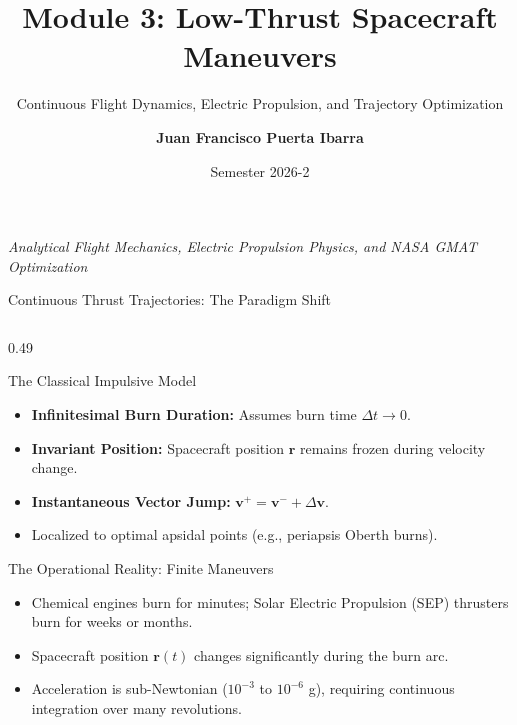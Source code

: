 \documentclass[aspectratio=169, 10pt]{beamer}
\title[Astrodynamics Module 3]{\textbf{Module 3: Low-Thrust Spacecraft Maneuvers}}
\subtitle{Continuous Flight Dynamics, Electric Propulsion, and Trajectory Optimization}
\author{\textbf{Juan Francisco Puerta Ibarra}}
\institute{Aerospace Engineering}
\date{Semester 2026-2}
\begin{document}
\begin{frame}[plain]
    \titlepage
    \begin{center}
        \scriptsize \textcolor{DarkSlate}{\textit{Analytical Flight Mechanics, Electric Propulsion Physics, and NASA GMAT Optimization}}
    \end{center}
\end{frame}

\begin{frame}{Continuous Thrust Trajectories: The Paradigm Shift}
    \begin{columns}[T]
        \begin{column}{0.49\textwidth}
            \begin{block}{The Classical Impulsive Model}
                \scriptsize
                \begin{itemize}\setlength{\itemsep}{2pt}\setlength{\topsep}{1pt}
                    \item \textbf{Infinitesimal Burn Duration:} Assumes burn time $\Delta t \to 0$.
                    \item \textbf{Invariant Position:} Spacecraft position $\mathbf{r}$ remains frozen during velocity change.
                    \item \textbf{Instantaneous Vector Jump:} $\mathbf{v}^+ = \mathbf{v}^- + \Delta \mathbf{v}$.
                    \item Localized to optimal apsidal points (e.g., periapsis Oberth burns).
                \end{itemize}
            \end{block}
            \vspace{-0.1cm}
            \begin{alertblock}{The Operational Reality: Finite Maneuvers}
                \scriptsize
                \begin{itemize}\setlength{\itemsep}{2pt}\setlength{\topsep}{1pt}
                    \item Chemical engines burn for minutes; Solar Electric Propulsion (SEP) thrusters burn for weeks or months.
                    \item Spacecraft position $\mathbf{r}(t)$ changes significantly during the burn arc.
                    \item Acceleration is sub-Newtonian ($10^{-3}$ to $10^{-6}$ g), requiring continuous integration over many revolutions.
                \end{itemize}
            \end{alertblock}
        \end{column}


\end{columns}
\end{frame}
\end{document}
